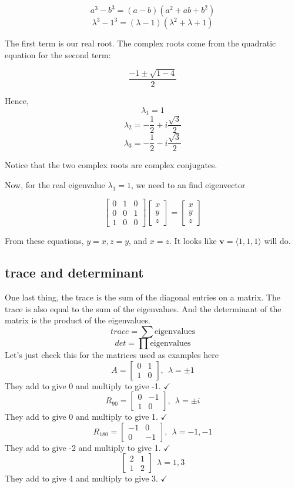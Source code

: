 \documentclass[11pt, oneside]{article}
\begin{document}
\[ a^3 - b^3 = (a-b)(a^2 + ab + b^2) \]
\[ \lambda^3 - 1^3 = (\lambda-1)(\lambda^2 + \lambda + 1) \]

The first term is our real root.  The complex roots come from the quadratic equation for the second term:

\[ \frac{-1 \pm \sqrt{1 - 4}}{2}  \]

Hence, 
\[ \lambda_1 = 1 \]
\[ \lambda_2 = -\frac{1}{2} + i\frac{\sqrt{3}}{2} \]
\[ \lambda_3 = -\frac{1}{2} - i\frac{\sqrt{3}}{2} \]

Notice that the two complex roots are complex conjugates.  

Now, for the real eigenvalue $\lambda_1 = 1$, we need to an find eigenvector

\[
\begin{bmatrix}
0 & 1 & 0  \\  
0 & 0 & 1  \\  
1 & 0 & 0 
\end{bmatrix}
\begin{bmatrix}
x  \\  
y  \\  
z 
\end{bmatrix}
=
\begin{bmatrix}
x  \\  
y  \\  
z 
\end{bmatrix}
\]

From these equations, $y = x, z = y$, and $x = z$.  It looks like $\mathbf{v} = \langle 1,1,1 \rangle$ will do.

\subsection*{trace and determinant}

One last thing, the trace is the sum of the diagonal entries on a matrix.  The trace is also equal to the sum of the eigenvalues.  And the determinant of the matrix is the product of the eigenvalues.
\[ trace = \sum \text{eigenvalues} \]
\[ det = \prod \text{eigenvalues} \]
Let's just check this for the matrices used as examples here
\[
A = 
\begin{bmatrix}
0 & 1  \\  
1 & 0  
\end{bmatrix},
\ \ \lambda = \pm 1
\]
They add to give 0 and multiply to give -1.  $\checkmark$
\[
R_{90}  = 
\begin{bmatrix}
0 & -1  \\  
1 & 0  
\end{bmatrix}, 
\ \ \lambda = \pm i
\]
They add to give 0 and multiply to give 1.  $\checkmark$
\[
R_{180} = 
\begin{bmatrix}
-1 & 0  \\  
0 & -1  
\end{bmatrix}, 
\ \ \lambda = -1,-1
\]
They add to give -2 and multiply to give 1.  $\checkmark$
\[
\begin{bmatrix}
2 & 1  \\  
1 & 2  
\end{bmatrix}
\ \ \lambda = 1,3
\]
They add to give 4 and multiply to give 3.  $\checkmark$
\end{document}
